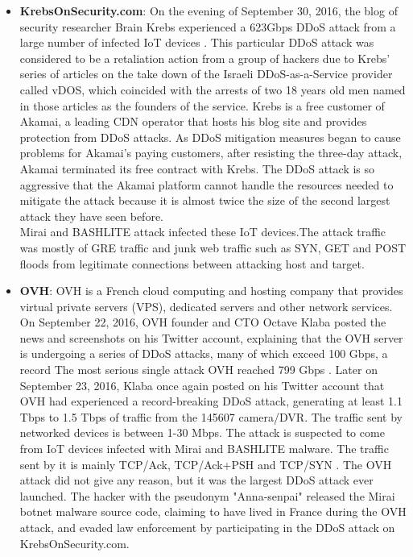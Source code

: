 \documentclass[conference]{IEEEtran}
\begin{document}
\begin{itemize}
\item{ \textbf{KrebsOnSecurity.com}: On the evening of September 30, 2016, the blog of security researcher Brain Krebs experienced a 623Gbps DDoS attack from a large number of infected IoT devices \cite{b17}. This particular DDoS attack
was considered to be a retaliation action from a group of hackers due to Krebs’ series of articles on the take down of the Israeli DDoS-as-a-Service provider called vDOS, which coincided with the arrests of two 18 years old men named
in those articles as the founders of the service\cite{b18}. Krebs is a free customer of Akamai, a leading CDN operator that hosts his blog site and provides protection from DDoS attacks. As DDoS mitigation measures began to cause problems for Akamai's paying customers, after resisting the three-day attack, Akamai terminated its free contract with Krebs. The DDoS attack is so aggressive that the Akamai platform cannot handle the resources needed to mitigate the attack because it is almost twice the size of the second largest attack they have seen before.\\

 Mirai and BASHLITE attack infected these IoT devices.The attack traffic was mostly of GRE traffic and junk web traffic such as SYN, GET and POST floods from legitimate connections between attacking host and target.}

\item{\textbf{OVH}: OVH is a French cloud computing and hosting company that provides virtual private servers (VPS), dedicated servers and other network services. On September 22, 2016, OVH founder and CTO Octave Klaba posted the news and screenshots on his Twitter account, explaining that the OVH server is undergoing a series of DDoS attacks, many of which exceed 100 Gbps, a record The most serious single attack OVH reached 799 Gbps \cite{b19}. Later on September 23, 2016, Klaba once again posted on his Twitter account that OVH had experienced a record-breaking DDoS attack, generating at least 1.1 Tbps to 1.5 Tbps of traffic from the 145607 camera/DVR. The traffic sent by networked devices is between 1-30 Mbps. The attack is suspected to come from IoT devices infected with Mirai and BASHLITE malware. The traffic sent by it is mainly TCP/Ack, TCP/Ack+PSH and TCP/SYN \cite{b19}. The OVH attack did not give any reason, but it was the largest DDoS attack ever launched. The hacker with the pseudonym "Anna-senpai" released the Mirai botnet malware source code, claiming to have lived in France during the OVH attack, and evaded law enforcement by participating in the DDoS attack on KrebsOnSecurity.com.}


\end{itemize}
\end{document}
